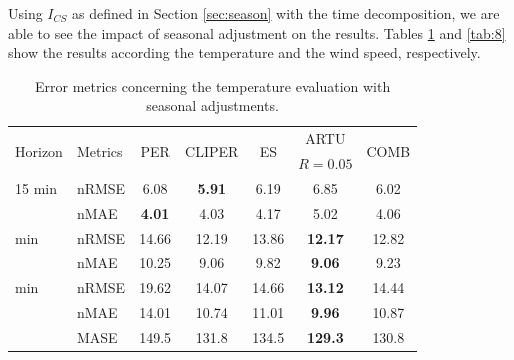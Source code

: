 Using $I_{CS}$ as defined in Section \ref{sec:season} with the time decomposition, we are able to see the impact of seasonal adjustment on the results. Tables \ref{tab:7} and \ref{tab:8} show the results according the temperature and the wind speed, respectively.

\begin{table}[tb]
\centering
    \begin{tabular}{@{}llccccc@{}}
    	\toprule
    	\multirow{2}{*}{Horizon} & \multirow{2}{*}{Metrics} & \multirow{2}{*}{PER} & \multirow{2}{*}{CLIPER} & \multirow{2}{*}{ES} &      ARTU      & \multirow{2}{*}{COMB} \\
    	                         &                          &                       &                           &                     &   $R=0.05$   &                       \\ \midrule	
    	15 min                   & nRMSE                    &         6.08          &       \textbf{5.91}       &        6.19         &      6.85      &         6.02          \\ 
    	                         & nMAE                     &     \textbf{4.01}     &           4.03            &        4.17         &      5.02      &         4.06          \\ \addlinespace
    	75 min                   & nRMSE                    &         14.66         &           12.19           &        13.86        & \textbf{12.17} &         12.82         \\ 
    	                         & nMAE                     &         10.25         &           9.06            &        9.82         & \textbf{9.06}  &         9.23          \\ \addlinespace
    	150 min                  & nRMSE                    &         19.62         &           14.07           &        14.66        & \textbf{13.12} &         14.44         \\ 
    	                         & nMAE                     &         14.01         &           10.74           &        11.01        & \textbf{9.96}  &         10.87         \\ \addlinespace
    	                         & MASE                     &         149.5         &           131.8           &        134.5        & \textbf{129.3} &         130.8         \\ \bottomrule
    \end{tabular}
\caption{Error metrics concerning the temperature evaluation with seasonal adjustments.}
\label{tab:7}
\end{table}


